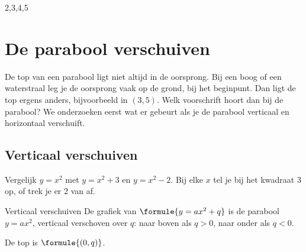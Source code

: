 \begin{alleenvoor}{2,3,4,5}
\section{De parabool verschuiven}

De top van een parabool ligt niet altijd in de oorsprong. Bij een boog of een waterstraal leg je de oorsprong vaak op de grond, bij het beginpunt. Dan ligt de top ergens anders, bijvoorbeeld in $(3, 5)$. Welk voorschrift hoort dan bij de parabool? We onderzoeken eerst wat er gebeurt als je de parabool verticaal en horizontaal verschuift.

\subsection{Verticaal verschuiven}

Vergelijk $y = x^2$ met $y = x^2 + 3$ en $y = x^2 - 2$. Bij elke $x$ tel je bij het kwadraat $3$ op, of trek je er $2$ van af.


\begin{theorie}
\begin{stelling}{Verticaal verschuiven}
De grafiek van $\formule{y = ax^2 + q}$ is de parabool $y = ax^2$, verticaal verschoven over $q$: naar boven als $q > 0$, naar onder als $q < 0$.

De top is $\formule{(0, q)}$.
\end{stelling}
\end{theorie}


\end{alleenvoor}
